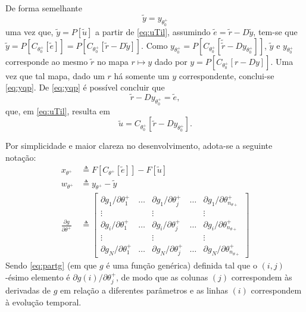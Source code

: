 De forma semelhante
\begin{equation}
   \tilde{y}=y_{\theta_{0}^{+}}
\label{eq:yqp}
\end{equation}
uma vez que, $\tilde{y}=P[\tilde{u}]$ a partir de \eqref{eq:uTil}, assumindo $\tilde{e}=\tilde{r}-D \tilde{y}$,  tem-se que $\tilde{y}=P\left[C_{\theta_{0}^{+}}[\tilde{e}]\right]=$$P\left[C_{\theta_{0}^{+}}[\tilde{r}-D \tilde{y}]\right]$. Como
$y_{\theta_{0}^{+}}=P\left[C_{\theta_{0}^{+}}\left[\tilde{\tilde{r}}-D y_{\theta_{0}^{+}}\right]\right]$, 
$\tilde{y}$ e $y_{\theta_{0}^{+}}$ corresponde ao mesmo $\tilde{r}$ no mapa $r \mapsto y$ dado por $y=P\left[C_{\theta_{0}^{+}}[r-D y]\right]$.
Uma vez que tal mapa, dado um $r$ há somente um $y$ correspondente, conclui-se \eqref{eq:yqp}.
De \eqref{eq:yqp} é possível concluir que 
\begin{equation}
   \tilde{r}-D y_{\theta_{0}^{+}}=\tilde{e},
\label{eq:eTil}
\end{equation}
que, em \eqref{eq:uTil}, resulta em
\begin{equation}
\tilde{u}=C_{\theta_{0}^{+}}\left[\tilde{r}-D y_{\theta_{0}^{+}}\right].
\label{eq:uTil_2}
\end{equation}


Por simplicidade e maior clareza no desenvolvimento, adota-se a seguinte notação:
\begin{align}
   x_{\theta^{+}} &\triangleq F\left[C_{\theta^{+}}[\tilde{e}]\right]-F[\tilde{u}] \label{eq:x} \\
   w_{\theta^{+}} &\triangleq y_{\theta^{+}}-\tilde{y} \label{eq:w} \\
   \frac{\partial g}{\partial \theta^{+}} &\triangleq 
   \begin{bmatrix} 
      \partial g_1/\partial \theta^{+}_1 & \dots & \partial g_1/\partial \theta^{+}_j & \dots & \partial g_1/\partial \theta^{+}_{n_{\theta +}} \\
      \vdots &  & \vdots & & \vdots \\
      \partial g_i/\partial \theta^{+}_1 & \dots & \partial g_i/\partial \theta^{+}_j & \dots & \partial g_i/\partial \theta^{+}_{n_{\theta +}} \\
      \vdots & & \vdots & & \vdots \\
      \partial g_N/\partial \theta^{+}_1 & \dots & \partial g_N/\partial \theta^{+}_j & \dots & \partial g_N/\partial \theta^{+}_{n_{\theta +}}
   \end{bmatrix} \label{eq:partg}
\end{align}
Sendo \eqref{eq:partg} (em que $g$ é uma função genérica) definida tal que o $(i,j)$-ésimo elemento é $\partial g(i) /\partial \theta^{+}_j$, de modo que as colunas $(j)$ correspondem às derivadas de $g$ em relação a diferentes parâmetros e as linhas $(i)$ correspondem à evolução temporal.

